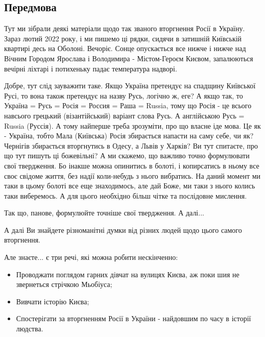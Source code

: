  
 
 
 
 
\subsection{Передмова}

Тут ми зібрали деякі матеріали щодо так званого вторгнення Росії в Україну.
Зараз лютий 2022 року, і ми пишемо ці рядки, сидячи в затишній Київській
квартирі десь на Оболоні. Вечоріє. Сонце опускається все нижче і нижче над
Вічним Городом Ярослава і Володимира - Містом-Героєм Києвом, запалюються
вечірні ліхтарі і потихеньку падає температура надворі.

Добре, тут слід зауважити таке. Якщо Україна претендує на спадщину Київської
Русі, то вона також претендує на назву Русь, логічно ж, еге? А якщо так, то
Україна = Русь = Росія = Россия = Раша = Russia, тому що Росія - це всього
навсього грецький (візантійський) варіант слова Русь. А англійською Русь =
Russia (Руссія). А тому найперше треба зрозуміти, про що власне іде мова. Це як
- Україна, тобто Мала (Київська) Росія збирається напасти на саму себе, чи як?
Чернігів збирається вторгнутись в Одесу, а Львів у Харків? Ви тут спитаєте, про
що тут пишуть ці божевільні?  А ми скажемо, що важливо точно формулювати свої
твердження. Бо інакше можна опинитись в болоті, і копирсатись в ньому все своє
свідоме життя, без надії коли-небудь з нього вибратись. На даний момент ми таки
в цьому болоті все еще знаходимось, але дай Боже, ми таки з нього колись таки
виберемось. А для цього необхідно більш чітке та послідовне мислення.

Так що, панове, формулюйте точніше свої твердження. А далі...

А далі Ви знайдете різноманітні думки від різних людей щодо цього самого
вторгнення.

Але знаєте... є три речі, які можна робити нескінченно:

\begin{itemize} %
\item Проводжати поглядом гарних дівчат на вулицях Києва, аж поки шия не звернеться стрічкою Мьобіуса;
\item Вивчати історію Києва;
\item Спостерігати за вторгненням Росії в України - найдовшим по часу в історії людства.
\end{itemize} %


